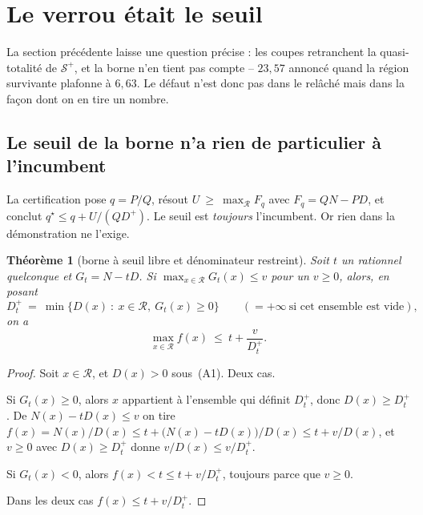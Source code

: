 \documentclass[11pt,a4paper]{article}
\theoremstyle{plain}
\newtheorem{theorem}{Théorème}
\theoremstyle{remark}
\newcommand{\Scal}{\mathcal{S}}
\newcommand{\Rcal}{\mathcal{R}}
\newcommand{\qs}{q^{\star}}
\begin{document}
\section{Le verrou était le seuil}
\label{sec:seuil}

La section précédente laisse une question précise : les coupes retranchent
la quasi-totalité de $\Scal^{+}$, et la borne n'en tient pas compte --
$23{,}57$ annoncé quand la région survivante plafonne à $6{,}63$. Le défaut
n'est donc pas dans le relâché mais dans la façon dont on en tire un nombre.

\subsection{Le seuil de la borne n'a rien de particulier à l'incumbent}

La certification pose $q=P/Q$, résout $U\ \ge\ \max_{\Rcal}F_q$ avec
$F_q=QN-PD$, et conclut $\qs\le q+U/(Q D^{+})$. Le seuil est \emph{toujours}
l'incumbent. Or rien dans la démonstration ne l'exige.

\begin{theorem}[borne à seuil libre et dénominateur restreint]
\label{th:seuil}
Soit $t$ un rationnel quelconque et $G_t=N-tD$. Si
$\max_{x\in\Rcal}G_t(x)\le v$ pour un $v\ge 0$, alors, en posant
\[
  D^{+}_{t}\ =\ \min\bigl\{D(x)\ :\ x\in\Rcal,\ G_t(x)\ge 0\bigr\}
  \qquad (=+\infty\ \text{si cet ensemble est vide}),
\]
on a
\[
  \max_{x\in\Rcal}f(x)\ \le\ t+\frac{v}{D^{+}_{t}} .
\]
\end{theorem}

\begin{proof}
Soit $x\in\Rcal$, et $D(x)>0$ sous~(A1). Deux cas.

Si $G_t(x)\ge 0$, alors $x$ appartient à l'ensemble qui définit
$D^{+}_{t}$, donc $D(x)\ge D^{+}_{t}$. De $N(x)-tD(x)\le v$ on tire
$f(x)=N(x)/D(x)\le t+\bigl(N(x)-tD(x)\bigr)/D(x)\le t+v/D(x)$, et
$v\ge 0$ avec $D(x)\ge D^{+}_{t}$ donne $v/D(x)\le v/D^{+}_{t}$.

Si $G_t(x)<0$, alors $f(x)<t\le t+v/D^{+}_{t}$, toujours parce que
$v\ge 0$.

Dans les deux cas $f(x)\le t+v/D^{+}_{t}$. \end{proof}
\end{document}
